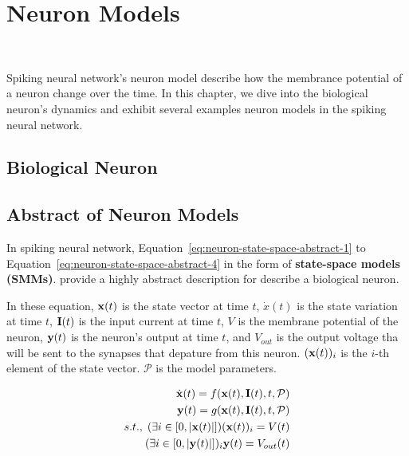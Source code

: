 

\chapter{Neuron Models}\

Spiking neural network's neuron model describe how the membrance potential of a neuron change over the time.
In this chapter, we dive into the biological neuron's dynamics and exhibit several examples neuron models in the 
spiking neural network. 


\section{Biological Neuron}


\section{Abstract of Neuron Models}
In spiking neural network, Equation~\ref{eq:neuron-state-space-abstract-1} to
Equation~\ref{eq:neuron-state-space-abstract-4} in the form of \textbf{state-space models (SMMs)}.
provide a highly abstract description for describe a biological neuron.

In these equation, $\bold x(t)$ is the state vector at time $t$, $\dot x(t)$ is the state variation at time 
$t$, $\bold I(t)$ is the input current at time $t$, $V$ is the membrane potential of the neuron, 
$\bold y(t)$ is the neuron's output at time $t$, and $V_{out}$ is the output voltage tha will be sent to the 
synapses that depature from this neuron. 
$(\bold x(t))_{i}$ is the $i$-th element of the state vector. $\mathcal P$ is the model parameters.

\begin{align}
    \dot {\bold x}(t) = f(\bold x(t), \bold I(t), t, \mathcal P) \label{eq:neuron-state-space-abstract-1}  \\
    \bold y(t) = g(\bold x(t), \bold I(t), t, \mathcal P) \label{eq:neuron-state-space-abstract-2} \\
    s.t.,\; (\exists i \in [0, |\bold x(t)|])(\bold x({t}))_{i} = V(t) \label{eq:neuron-state-space-abstract-3} \\
            (\exists i \in [0, |\bold y(t)|])_i\bold y(t) = V_{out}(t) \label{eq:neuron-state-space-abstract-4}
\end{align}


